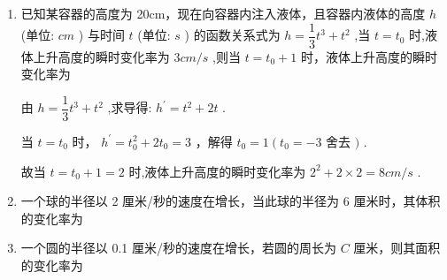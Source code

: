 \begin{enumerate}
\begin{enumerate}
        \begin{jieda}
            对于 ${A},y = {x}^{2}$ 在 $\left\lbrack  {-1,0}\right\rbrack$ 上的平均变化率为 $\dfrac{0 - 1}{0 - \left( {-1}\right) } =  - 1$ ,
            
            对于 ${B},y = {x}^{3}$ 在 $\left\lbrack  {-1,0}\right\rbrack$ 上的平均变化率为 $\dfrac{0 - \left( {-1}\right) }{0 - \left( {-1}\right) } = 1$ ,
            
            对于 ${C},y = {\left( \dfrac{1}{2}\right) }^{x}$ 在 $\left\lbrack  {-1,0}\right\rbrack$ 上的平均变化率为 $\dfrac{1 - {\left( \dfrac{1}{2}\right) }^{-1}}{0 - \left( {-1}\right) } =  - 1$ ,
            
            对于 ${D},y = {2}^{x}$ 在 $\left\lbrack  {-1,0}\right\rbrack$ 上的平均变化率为 $\dfrac{1 - {2}^{-1}}{0 - \left( {-1}\right) } = \dfrac{1}{2}$ ,
            
            故 $y = {x}^{3}$ 在 $\left\lbrack  {-1,0}\right\rbrack$ 上的平均变化率最大
        \end{jieda}
        
        \item 已知某容器的高度为 20cm，现在向容器内注入液体，且容器内液体的高度 $h$ (单位: ${{cm}}$ ) 与时间 $t$ (单位: ${s}$ ) 的函数关系式为 $h = \dfrac{1}{3}{t}^{3} + {t}^{2}$ ,当 $t = {t}_{0}$ 时,液体上升高度的瞬时变化率为 $3{{cm}}/{s}$ ,则当 $t = {t}_{0} + 1$ 时，液体上升高度的瞬时变化率为

        \begin{jieda}
            由 $h = \dfrac{1}{3}{t}^{3} + {t}^{2}$ ,求导得: ${h}^{\prime } = {t}^{2} + {2t}$ .
            
            当 $t = {t}_{0}$ 时， ${h}^{\prime } = {t}_{0}^{2} + 2{t}_{0} = 3$ ，解得 ${t}_{0} = 1\left( {{t}_{0} =  - 3}\right.$ 舍去 $)$ .
            
            故当 $t = {t}_{0} + 1 = 2$ 时,液体上升高度的瞬时变化率为 ${2}^{2} + 2 \times  2 = 8{{cm}}/{s}$ .
        \end{jieda}
        \item 一个球的半径以 2 厘米/秒的速度在增长，当此球的半径为 6 厘米时，其体积的变化率为
        
        \item 一个圆的半径以 0.1 厘米/秒的速度在增长，若圆的周长为 $C$ 厘米，则其面积的变化率为
    \end{enumerate}
    

\end{enumerate}
